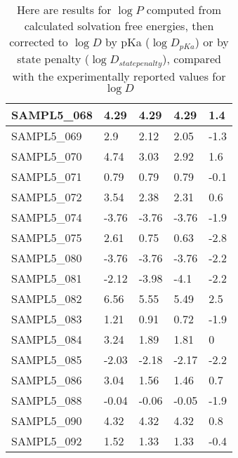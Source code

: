 \documentclass{article}
\begin{document}
\begin{table}[]
\begin{tabular}{|l|l|l|l|l|}
SAMPL5\_068 & 4.29     & 4.29           & 4.29                     & 1.4                     \\ \hline
SAMPL5\_069 & 2.9      & 2.12           & 2.05                     & -1.3                    \\ \hline
SAMPL5\_070 & 4.74     & 3.03           & 2.92                     & 1.6                     \\ \hline
SAMPL5\_071 & 0.79     & 0.79           & 0.79                     & -0.1                    \\ \hline
SAMPL5\_072 & 3.54     & 2.38           & 2.31                     & 0.6                     \\ \hline
SAMPL5\_074 & -3.76    & -3.76          & -3.76                    & -1.9                    \\ \hline
SAMPL5\_075 & 2.61     & 0.75           & 0.63                     & -2.8                    \\ \hline
SAMPL5\_080 & -3.76    & -3.76          & -3.76                    & -2.2                    \\ \hline
SAMPL5\_081 & -2.12    & -3.98          & -4.1                     & -2.2                    \\ \hline
SAMPL5\_082 & 6.56     & 5.55           & 5.49                     & 2.5                     \\ \hline
SAMPL5\_083 & 1.21     & 0.91           & 0.72                     & -1.9                    \\ \hline
SAMPL5\_084 & 3.24     & 1.89           & 1.81                     & 0                       \\ \hline
SAMPL5\_085 & -2.03    & -2.18          & -2.17                    & -2.2                    \\ \hline
SAMPL5\_086 & 3.04     & 1.56           & 1.46                     & 0.7                     \\ \hline
SAMPL5\_088 & -0.04    & -0.06          & -0.05                    & -1.9                    \\ \hline
SAMPL5\_090 & 4.32     & 4.32           & 4.32                     & 0.8                     \\ \hline
SAMPL5\_092 & 1.52     & 1.33           & 1.33                     & -0.4                    \\ \hline
\end{tabular}
\label{logDcorrections}
\caption{Here are results for $\log P$ computed from calculated solvation free energies, then corrected to $\log D$ by pKa ($\log D_{pKa}$) or by state penalty ($\log D_{state penalty}$), compared with the experimentally reported values for $\log D$} 
\end{table}
\end{document}
